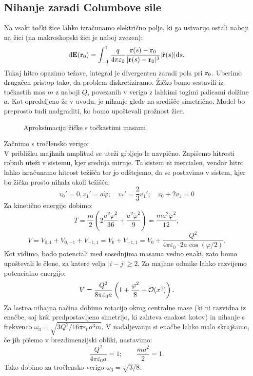 \documentclass{article}
\begin{document}
\subsection{Nihanje zaradi Columbove sile}
Na vsaki točki žice lahko izračunamo električno polje, ki ga ustvarijo ostali naboji na žici (na makroskopski žici je naboj zvezen):
\begin{equation}
    \mathrm{d}\mathbf{E}(\mathbf{r}_0)=\int_{-1}^1\frac{q}{4\pi\varepsilon_0}\frac{\mathbf{r}(s)-\mathbf{r}_0}{|\mathbf{r}(s)-\mathbf{r}_0|^3}|\dot{\mathbf{r}}(s)|\mathrm{d} s.
\end{equation}
Tukaj hitro opazimo težave, integral je divergenten zaradi pola pri $\mathbf{r}_0$. Uberimo drugačen pristop tako, da problem diskretiziramo. Žičko bomo sestavili iz točkastih mas $m$ z naboji $Q$, povezanih v verigo z lahkimi togimi palicami dolžine $a$. Kot opredeljeno že v uvodu, je nihanje glede na središče simetrično. Model bo preprosto tudi nadgraditi, ko bomo upoštevali prožnost žice.
\begin{figure}[H]
    \centering
    
    \caption{Aproksimacija žičke s točkastimi masami}
    \label{pic:diskret}
\end{figure}
Začnimo s tročlensko verigo:\\
V približku majhnih amplitud se uteži gibljejo le navpično. Zapišemo hitrosti robnih uteži v sistemu, kjer srednja miruje. Ta sistem ni inercialen, vendar hitro lahko izračunamo hitrost težišča ter jo odštejemo, da se postavimo v sistem, kjer bo žička prosto nihala okoli težišča:
\begin{equation}
    v_0'=0, v_1'=a\dot{\varphi};\quad v_*'=\frac{2}{3}v_1';\quad v_0+2v_1=0
\end{equation}
Za kinetično energijo dobimo:
\begin{equation}
    T = \frac{m}{2}\left(2\frac{a^2\dot{\varphi}^2}{36}+\frac{a^2\dot{\varphi}^2}{9}\right)=\frac{ma^2\dot{\varphi}^2}{12},
\end{equation}
\begin{equation}
    V = V_{0,1}+V_{0,-1}+V_{-1,1}=V_0+V_{-1,1}=V_0+\frac{Q^2}{4\pi\varepsilon_0\cdot2a\cos(\varphi/2)}.
\end{equation}
Kot vidimo, bodo potenciali med sosednjima masama vedno enaki, zato bomo upoštevali le člene, za katere velja $|i-j|\ge2$. Za majhne odmike lahko razvijemo potencialno energijo:
\begin{equation}
    V = \frac{Q^2}{8\pi\varepsilon_0a}\left(1+\frac{\varphi^2}{8}+\operatorname{\mathcal{O}}(x^4)\right).
\end{equation}
Za lastna nihajna načina dobimo rotacijo okrog centralne mase (ki ni razvidna iz enačbe, saj krši predpostavljeno simetrijo, ki zahteva enakost kotov) in nihanje s frekvenco $\omega_3=\sqrt{3Q^2/16\pi\varepsilon_0a^3m}$. V nadaljevanju si enačbe lahko malo skrajšamo, če jih pišemo v brezdimenzijski obliki, nastavimo:
\begin{equation}
    \frac{Q^2}{4\pi\varepsilon_0a}=1;\qquad\frac{ma^2}{2}=1.
    \label{eq:brezdim}
\end{equation}
Tako dobimo za tročlensko verigo $\omega_3=\sqrt{3/8}$.\\
\end{document}
